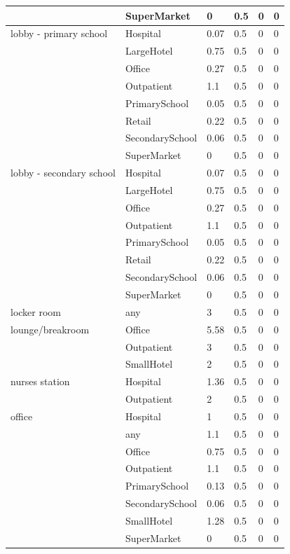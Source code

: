 \begin{center}
\begin{longtable}{|p{2.2in}|p{1.3in}|p{0.7in}|p{0.6in}|p{0.6in}|p{0.6in}|}
 & SuperMarket & 0 & 0.5 & 0 & 0 \\ \hline
lobby - primary school & Hospital & 0.07 & 0.5 & 0 & 0 \\ \hline
 & LargeHotel & 0.75 & 0.5 & 0 & 0 \\ \hline
 & Office & 0.27 & 0.5 & 0 & 0 \\ \hline
 & Outpatient & 1.1 & 0.5 & 0 & 0 \\ \hline
 & PrimarySchool & 0.05 & 0.5 & 0 & 0 \\ \hline
 & Retail & 0.22 & 0.5 & 0 & 0 \\ \hline
 & SecondarySchool & 0.06 & 0.5 & 0 & 0 \\ \hline
 & SuperMarket & 0 & 0.5 & 0 & 0 \\ \hline
lobby - secondary school & Hospital & 0.07 & 0.5 & 0 & 0 \\ \hline
 & LargeHotel & 0.75 & 0.5 & 0 & 0 \\ \hline
 & Office & 0.27 & 0.5 & 0 & 0 \\ \hline
 & Outpatient & 1.1 & 0.5 & 0 & 0 \\ \hline
 & PrimarySchool & 0.05 & 0.5 & 0 & 0 \\ \hline
 & Retail & 0.22 & 0.5 & 0 & 0 \\ \hline
 & SecondarySchool & 0.06 & 0.5 & 0 & 0 \\ \hline
 & SuperMarket & 0 & 0.5 & 0 & 0 \\ \hline
locker room & any & 3 & 0.5 & 0 & 0 \\ \hline
lounge/breakroom & Office & 5.58 & 0.5 & 0 & 0 \\ \hline
 & Outpatient & 3 & 0.5 & 0 & 0 \\ \hline
 & SmallHotel & 2 & 0.5 & 0 & 0 \\ \hline
nurses station & Hospital & 1.36 & 0.5 & 0 & 0 \\ \hline
 & Outpatient & 2 & 0.5 & 0 & 0 \\ \hline
office & Hospital & 1 & 0.5 & 0 & 0 \\ \hline
 & any & 1.1 & 0.5 & 0 & 0 \\ \hline
 & Office & 0.75 & 0.5 & 0 & 0 \\ \hline
 & Outpatient & 1.1 & 0.5 & 0 & 0 \\ \hline
 & PrimarySchool & 0.13 & 0.5 & 0 & 0 \\ \hline
 & SecondarySchool & 0.06 & 0.5 & 0 & 0 \\ \hline
 & SmallHotel & 1.28 & 0.5 & 0 & 0 \\ \hline
 & SuperMarket & 0 & 0.5 & 0 & 0 \\ \hline

\end{longtable}
\end{center}
